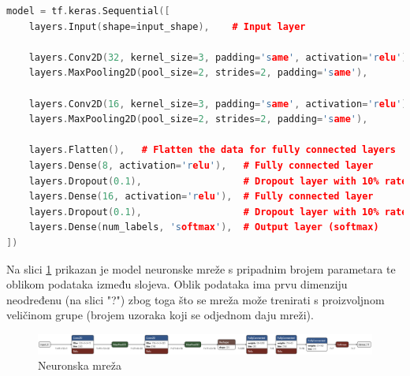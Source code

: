 \begin{lstlisting}[language=C++, caption=Struktura mreže, label=code:network]
model = tf.keras.Sequential([
    layers.Input(shape=input_shape),    # Input layer

    layers.Conv2D(32, kernel_size=3, padding='same', activation='relu'),
    layers.MaxPooling2D(pool_size=2, strides=2, padding='same'),

    layers.Conv2D(16, kernel_size=3, padding='same', activation='relu'),
    layers.MaxPooling2D(pool_size=2, strides=2, padding='same'),

    layers.Flatten(),   # Flatten the data for fully connected layers
    layers.Dense(8, activation='relu'),   # Fully connected layer
    layers.Dropout(0.1),                  # Dropout layer with 10% rate
    layers.Dense(16, activation='relu'),  # Fully connected layer
    layers.Dropout(0.1),                  # Dropout layer with 10% rate
    layers.Dense(num_labels, 'softmax'),  # Output layer (softmax)
])
\end{lstlisting}

Na slici \ref{pic:struktura} prikazan je model neuronske mreže s pripadnim brojem
parametara te oblikom podataka između slojeva. Oblik podataka ima prvu dimenziju 
neodređenu (na slici "?") zbog toga što se mreža može trenirati s proizvoljnom 
veličinom grupe (brojem uzoraka koji se odjednom daju mreži).

\begin{figure}[htb]
    \centering
    \includegraphics[width=1\linewidth]{Chapters/neuronska_mreza/struktura/model.png} 
    \caption{Neuronska mreža \cite{netron}}
    \label{pic:struktura}
\end{figure}

